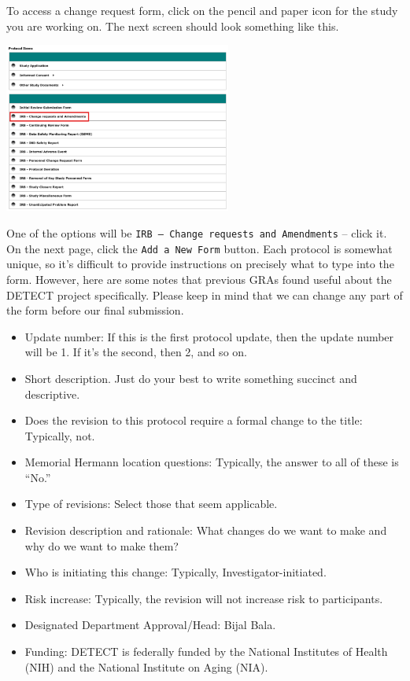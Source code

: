 \documentclass[
  letterpaper,
  DIV=11,
  numbers=noendperiod]{scrreprt}
\providecommand{\tightlist}{%
  \setlength{\itemsep}{0pt}\setlength{\parskip}{0pt}}\usepackage{longtable,booktabs,array}
\begin{document}
To access a change request form, click on the pencil and paper icon for
the study you are working on. The next screen should look something like
this.

\begin{center}
\includegraphics[width=2.94in,height=\textheight]{chapters/gra_tasks/../../graphics/change_request.png}
\end{center}

One of the options will be
\texttt{IRB\ –\ Change\ requests\ and\ Amendments} -- click it. On the
next page, click the \texttt{Add\ a\ New\ Form} button. Each protocol is
somewhat unique, so it's difficult to provide instructions on precisely
what to type into the form. However, here are some notes that previous
GRAs found useful about the DETECT project specifically. Please keep in
mind that we can change any part of the form before our final
submission.

\begin{itemize}
\tightlist
\item
  Update number: If this is the first protocol update, then the update
  number will be 1. If it's the second, then 2, and so on.
\item
  Short description. Just do your best to write something succinct and
  descriptive.
\item
  Does the revision to this protocol require a formal change to the
  title: Typically, not.\\
\item
  Memorial Hermann location questions: Typically, the answer to all of
  these is ``No.''
\item
  Type of revisions: Select those that seem applicable.
\item
  Revision description and rationale: What changes do we want to make
  and why do we want to make them?
\item
  Who is initiating this change: Typically, Investigator-initiated.
\item
  Risk increase: Typically, the revision will not increase risk to
  participants.
\item
  Designated Department Approval/Head: Bijal Bala.
\item
  Funding: DETECT is federally funded by the National Institutes of
  Health (NIH) and the National Institute on Aging (NIA).
\end{itemize}
\end{document}
